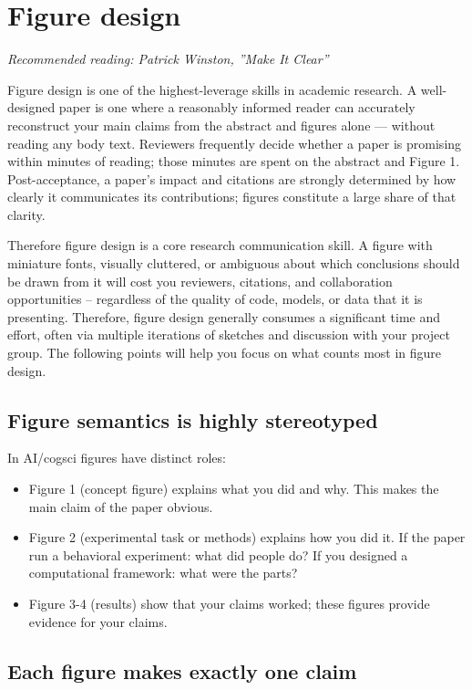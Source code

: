 \documentclass[11pt, letterpaper]{article}
\begin{document}
\section{Figure design}

\textit{Recommended reading: Patrick Winston, ''Make It Clear''}

Figure design is one of the highest-leverage skills in academic research. 
A well-designed paper is one where a reasonably informed reader can accurately reconstruct your main claims from the abstract and figures alone --- without reading any body text. Reviewers frequently decide whether a paper is 
promising within minutes of reading; those minutes are spent on the 
abstract and Figure 1. Post-acceptance, a paper's impact and citations 
are strongly determined by how clearly it communicates its contributions; 
figures constitute a large share of that clarity.

Therefore figure design is a core research communication skill. A figure with miniature fonts, visually cluttered, or ambiguous about which conclusions should be drawn from it will cost you reviewers, citations, and collaboration opportunities  -- regardless of the quality of code, models, or data that it is presenting. Therefore,  figure design generally consumes a significant time and effort, often via multiple iterations of sketches and discussion with your project group. The following points will help you focus on what counts most in figure design.

\subsection{Figure semantics is highly stereotyped}

In AI/cogsci figures have distinct roles:

\begin{itemize}
    \item Figure 1 (concept figure) explains  what you did and why. This makes the  main claim of the paper obvious.
    \item Figure 2 (experimental task or methods) explains how you did it. If the paper run a behavioral experiment: what did people do? If you designed a computational framework: what were the parts?
    \item Figure 3-4 (results) show that your claims worked; these figures provide evidence for your claims.
\end{itemize}

\subsection{Each figure makes exactly one claim}
\end{document}
